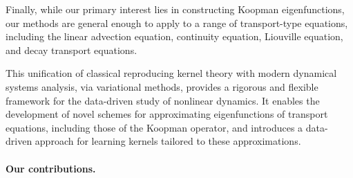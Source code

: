\documentclass[11pt]{article}
\theoremstyle{plain}
\begin{document}
Finally, while our primary interest lies in constructing Koopman eigenfunctions, our methods are general enough to apply to a range of transport-type equations, including the linear advection equation, continuity equation, Liouville equation, and decay transport equations. 

This unification of classical reproducing kernel theory with modern dynamical systems  analysis,  via variational methods, provides a rigorous and flexible framework for  the data-driven study of nonlinear dynamics. It enables the development of novel schemes for approximating eigenfunctions of transport equations, including those of the Koopman operator, and introduces a data-driven approach for learning kernels tailored to these approximations.



\paragraph{Our contributions.}
\end{document}
